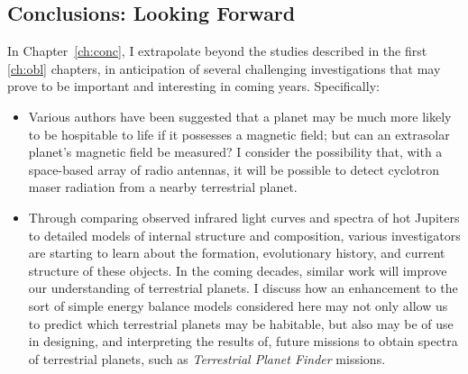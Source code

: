 \subsection[Conclusions: Looking Forward]{Conclusions: Looking Forward}
\label{intro_ssec:conc}
In Chapter~\ref{ch:conc}, I extrapolate beyond the studies described
in the first \ref{ch:obl} chapters, in anticipation of several
challenging investigations that may prove to be important and
interesting in coming years.  Specifically:
\begin{itemize}
\item Various authors have been suggested that a planet may be much
more likely to be hospitable to life if it possesses a magnetic field;
but can an extrasolar planet's magnetic field be measured?  I consider
the possibility that, with a space-based array of radio antennas, it
will be possible to detect cyclotron maser radiation from a nearby
terrestrial planet.
\item Through comparing observed infrared light curves and spectra of
hot Jupiters to detailed models of internal structure and composition,
various investigators are starting to learn about the formation,
evolutionary history, and current structure of these objects.  In the
coming decades, similar work will improve our understanding of
terrestrial planets.  I discuss how an enhancement to the sort of
simple energy balance models considered here may not only allow us to
predict which terrestrial planets may be habitable, but also may be of
use in designing, and interpreting the results of, future missions to
obtain spectra of terrestrial planets, such as {\it Terrestrial Planet
Finder} missions.
\end{itemize}


\cleardoublepage
